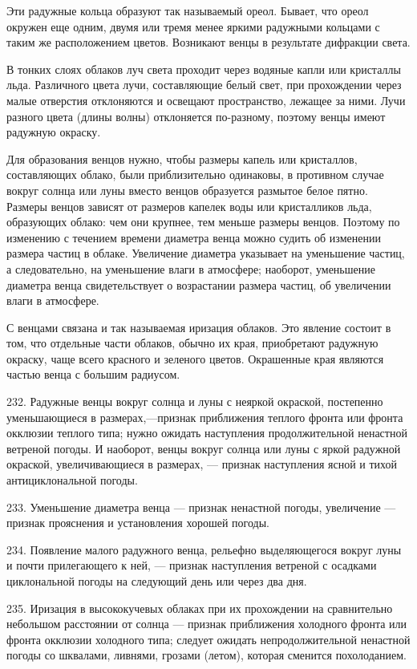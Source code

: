Эти радужные кольца образуют так называемый ореол. Бывает, что ореол окружен еще одним, двумя или тремя менее яркими радужными кольцами с таким же расположением цветов. Возникают венцы в результате дифракции света.

В тонких слоях облаков луч света проходит через водяные капли или кристаллы льда. Различного цвета лучи, составляющие белый свет, при прохождении через малые отверстия отклоняются и освещают пространство, лежащее за ними. Лучи разного цвета (длины волны) отклоняется по-разному, поэтому венцы имеют радужную окраску.

Для образования венцов нужно, чтобы размеры капель или кристаллов, составляющих облако, были приблизительно одинаковы, в противном случае вокруг солнца или луны вместо венцов образуется размытое белое пятно. Размеры венцов зависят от размеров капелек воды или кристалликов льда, образующих облако: чем они крупнее, тем меньше размеры венцов. Поэтому по изменению с течением времени диаметра венца можно судить об изменении размера частиц в облаке. Увеличение диаметра указывает на уменьшение частиц, а следовательно, на уменьшение влаги в атмосфере; наоборот, уменьшение диаметра венца свидетельствует о возрастании размера частиц, об увеличении влаги в атмосфере.

С венцами связана и так называемая иризация облаков. Это явление состоит в том, что отдельные части облаков, обычно их края, приобретают радужную окраску, чаще всего красного и зеленого цветов. Окрашенные края являются частью венца с большим радиусом.

232. Радужные венцы вокруг солнца и луны с неяркой окраской, постепенно уменьшающиеся в размерах,—признак приближения теплого фронта или фронта окклюзии теплого типа; нужно ожидать наступления продолжительной ненастной ветреной погоды. И наоборот, венцы вокруг солнца или луны с яркой радужной окраской, увеличивающиеся в размерах, — признак наступления ясной и тихой антициклональной погоды.

233. Уменьшение диаметра венца — признак ненастной погоды, увеличение — признак прояснения и установления хорошей погоды.

234. Появление малого радужного венца, рельефно выделяющегося вокруг луны и почти прилегающего к ней, — признак наступления ветреной с осадками циклональной погоды на следующий день или через два дня.

235. Иризация в высококучевых облаках при их прохождении на сравнительно небольшом расстоянии от солнца — признак приближения холодного фронта или фронта окклюзии холодного типа; следует ожидать непродолжительной ненастной погоды со шквалами, ливнями, грозами (летом), которая сменится похолоданием.

